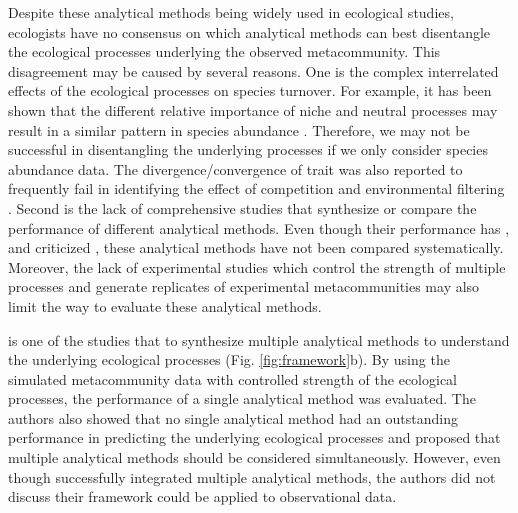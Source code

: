 Despite these analytical methods being widely used in ecological studies, ecologists have no consensus on which analytical methods can best disentangle the ecological processes underlying the observed metacommunity. This disagreement may be caused by several reasons. One is the complex interrelated effects of the ecological processes on species turnover. For example, it has been shown that the different relative importance of niche and neutral processes may result in a similar pattern in species abundance \citep{chave2002comparing, mcgill2010towards}. Therefore, we may not be successful in disentangling the underlying processes if we only consider species abundance data. The divergence/convergence of trait was also reported to frequently fail in identifying the effect of competition and environmental filtering \citep{mayfield2010opposing}. Second is the lack of comprehensive studies that synthesize or compare the performance of different analytical methods. Even though their performance has \DIFdelbegin {}\DIFdelend \DIFaddbegin {}\DIFaddend \citep{mcgill2006empirical, vellend2014assessing, tucker2016differentiating, ning2019general}, and criticized \citep{smith2010variation, molina2020difficulties, brown2017making}, these analytical methods have not been compared systematically. Moreover, the lack of experimental studies which control the strength of multiple processes and generate replicates of experimental metacommunities may also limit the way to evaluate these analytical methods. 

\citet{guzman2022accounting} is one of the studies that \DIFdelbegin {}\DIFdelend \DIFaddbegin {}\DIFaddend to synthesize multiple analytical methods to understand the underlying ecological processes (Fig. \ref{fig:framework}b). By using the simulated metacommunity data with controlled strength of the ecological processes, the performance of a single analytical method was evaluated. The authors also showed that no single analytical method had an outstanding performance in predicting the underlying ecological processes and proposed that multiple analytical methods should be considered simultaneously. However, even though \citet{guzman2022accounting} successfully integrated multiple analytical methods, the authors did not discuss \DIFdelbegin {}\DIFdelend \DIFaddbegin {}\DIFaddend their framework could be applied to observational data.

